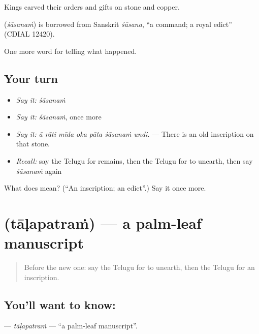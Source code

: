 Kings carved their orders and gifts on stone and copper.

\begin{cousinweb}
\textbf{} (\emph{śāsanaṁ}) is borrowed from Sanskrit \emph{śāsana}, \textquotedblleft{}a command; a royal edict\textquotedblright{} (CDIAL 12420).
\end{cousinweb}

\begin{grammarlens}[title={What you've built}]
One more word for telling what happened.
\end{grammarlens}

\subsection*{Your turn}
\begin{itemize}
\raggedright
  \item \emph{Say it:} \emph{śāsanaṁ}
  \item \emph{Say it:} \emph{śāsanaṁ}, once more
  \item \emph{Say it:} \emph{ā rāti mīda oka pāta śāsanaṁ undi.} — There is an old inscription on that stone.
  \item \emph{Recall:} say the Telugu for remains, then the Telugu for to unearth, then say \emph{śāsanaṁ} again
\end{itemize}

\begin{tcolorbox}[breakable,colback=teal!4,colframe=teal!35!black,title={Before you move on}]
What does  mean? (\textquotedblleft{}An inscription; an edict\textquotedblright{}.) Say it once more.
\end{tcolorbox}
\section[\texorpdfstring{\te{తాళపత్రం} (tāḷapatraṁ)}{తాళపత్రం (tāḷapatraṁ)}]{ (tāḷapatraṁ) — a palm-leaf manuscript}

\label{lesson:TE-C368-talapatram}



\begin{quote}
Before the new one: say the Telugu for to unearth, then the Telugu for an inscription.
\end{quote}

\subsection*{You'll want to know: }
\textbf{} — \emph{tāḷapatraṁ} — \textquotedblleft{}a palm-leaf manuscript\textquotedblright{}.

